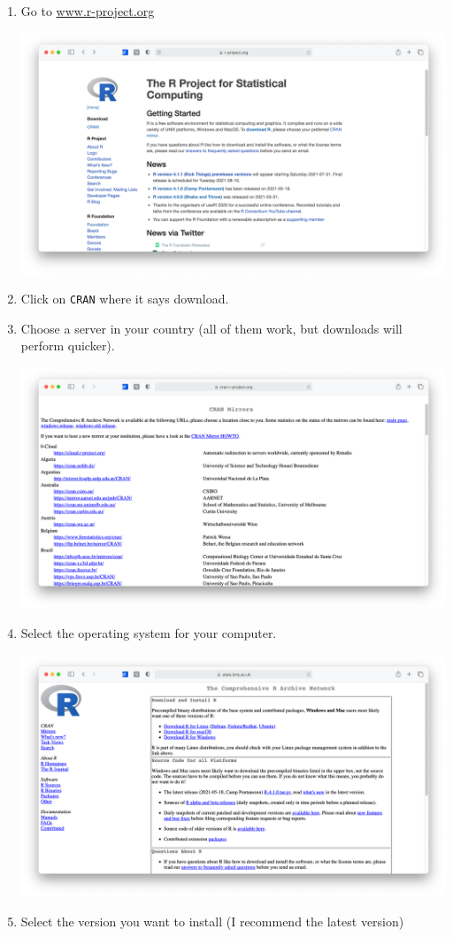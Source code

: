 \documentclass[
]{book}
\begin{document}
\begin{enumerate}
\def\labelenumi{\arabic{enumi}.}
\item
  Go to \href{https://www.r-project.org\%5D(https://www.r-project.org)}{www.r-project.org}

  \includegraphics{images/chapter_03_img/r_project/00_r_project_page.png}
\item
  Click on \texttt{CRAN} where it says download.
\item
  Choose a server in your country (all of them work, but downloads will perform quicker).

  \includegraphics{images/chapter_03_img/r_project/01_r_project_cran_mirror.png}
\item
  Select the operating system for your computer.

  \includegraphics{images/chapter_03_img/r_project/02_r_project_os_choice.png}
\item
  Select the version you want to install (I recommend the latest version)


\end{enumerate}
\end{document}

